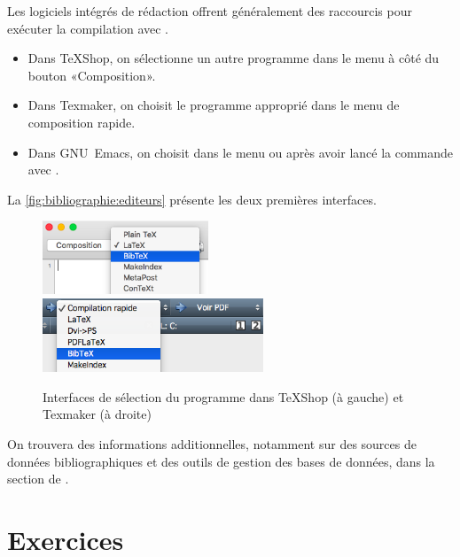 
Les logiciels intégrés de rédaction offrent généralement des raccourcis pour exécuter la
compilation avec {\BibTeX}.
\begin{itemize}
\item Dans TeXShop, on sélectionne un autre programme dans le menu à
  côté du bouton «Composition».
\item Dans Texmaker, on choisit le programme approprié dans le menu de
  composition rapide.
\item Dans GNU~Emacs, on choisit  dans le menu
   ou après avoir lancé la commande
   avec .
\end{itemize}
La \autoref{fig:bibliographie:editeurs} présente les deux premières
interfaces.

\begin{figure}
  \centering
  \includegraphics[height=2.2cm]{bibtex-texshop}
  \qquad
  \includegraphics[height=2.2cm]{bibtex-texmaker}
  \caption{Interfaces de sélection du programme {\BibTeX} dans TeXShop
    (à gauche)
    et Texmaker (à droite)}
  \label{fig:bibliographie:editeurs}
\end{figure}

On trouvera des informations additionnelles, notamment sur des sources
de données bibliographiques et des outils de gestion des bases de
données, dans la section %
de \citeauthor{wikilivres:latex}.




\section{Exercices}
\label{sec:bibliographie:exercices}

